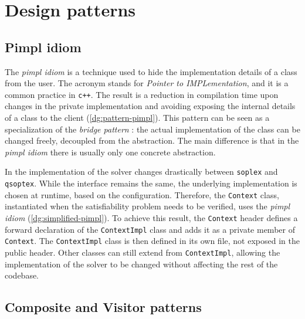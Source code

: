 \section{Design patterns}
\label{sec:patterns}

\subsection*{Pimpl idiom}

The \textit{pimpl idiom} \cite{man:pimpl} is a technique used to hide the implementation details of a class from the user.
The acronym stands for \textit{Pointer to IMPLementation}, and it is a common practice in \texttt{c++}.
The result is a reduction in compilation time upon changes in the private implementation and avoiding exposing the internal details of a class to the client (\autoref{dg:pattern-pimpl}).
This pattern can be seen as a specialization of the \textit{bridge pattern} \cite{book:gof}: the actual implementation of the class can be changed freely, decoupled from the abstraction.
The main difference is that in the \textit{pimpl idiom} there is usually only one concrete abstraction.


In \dlinear the implementation of the solver changes drastically between \texttt{soplex} and \texttt{qsoptex}.
While the interface remains the same, the underlying implementation is chosen at runtime, based on the configuration.
Therefore, the \texttt{Context} class, instantiated when the satisfiability problem needs to be verified, uses the \textit{pimpl idiom} (\autoref{dg:simplified-pimpl}).
To achieve this result, the \texttt{Context} header defines a forward declaration of the \texttt{ContextImpl} class and adds it as a private member of \texttt{Context}.
The \texttt{ContextImpl} class is then defined in its own file, not exposed in the public header.
Other classes can still extend from \texttt{ContextImpl}, allowing the implementation of the solver to be changed without affecting the rest of the codebase.


\subsection*{Composite and Visitor patterns}

